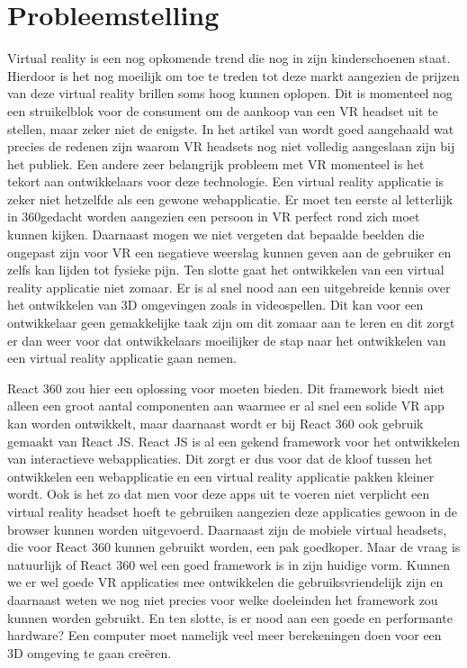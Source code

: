 \section{Probleemstelling}
\label{sec:probleemstelling}

Virtual reality is een nog opkomende trend die nog in zijn kinderschoenen staat. Hierdoor is het nog moeilijk om toe te treden tot deze markt aangezien de prijzen van deze virtual reality brillen soms hoog kunnen oplopen. Dit is momenteel nog een struikelblok voor de consument om de aankoop van een VR  headset uit te stellen, maar zeker niet de enigste. In het artikel van \autocite{Abarrera2017} wordt goed aangehaald wat precies de redenen zijn waarom VR headsets nog niet volledig aangeslaan zijn bij het publiek. Een andere zeer belangrijk probleem met VR momenteel is het tekort aan ontwikkelaars voor deze technologie. Een virtual reality applicatie is zeker niet hetzelfde als een gewone webapplicatie. Er moet ten eerste al letterlijk in 360\textdegree  gedacht worden aangezien een persoon in VR perfect rond zich moet kunnen kijken. Daarnaast mogen we niet vergeten dat bepaalde beelden die ongepast zijn voor VR een negatieve weerslag kunnen geven aan de gebruiker en zelfs kan lijden tot fysieke pijn. Ten slotte gaat het ontwikkelen van een virtual reality applicatie niet zomaar. Er is al snel nood aan een uitgebreide kennis over het ontwikkelen van 3D omgevingen zoals in videospellen. Dit kan voor een ontwikkelaar geen gemakkelijke taak zijn om dit zomaar aan te leren en dit zorgt er dan weer voor dat ontwikkelaars moeilijker de stap naar het ontwikkelen van een virtual reality applicatie gaan nemen.

React 360 zou hier een oplossing voor moeten bieden. Dit framework biedt niet alleen een groot aantal componenten aan waarmee er al snel een solide VR app kan worden ontwikkelt, maar daarnaast wordt er bij React 360 ook gebruik gemaakt van React JS. React JS is al een gekend framework voor het ontwikkelen van interactieve webapplicaties. Dit zorgt er dus voor dat de kloof tussen het ontwikkelen een webapplicatie en een virtual reality applicatie pakken kleiner wordt. Ook is het zo dat men voor deze apps uit te voeren niet verplicht een virtual reality headset hoeft te gebruiken aangezien deze applicaties gewoon in de browser kunnen worden uitgevoerd. Daarnaast zijn de mobiele virtual headsets, die voor React 360 kunnen gebruikt worden, een pak goedkoper. Maar de vraag is natuurlijk of React 360 wel een goed framework is in zijn huidige vorm. Kunnen we er wel goede VR applicaties mee ontwikkelen die gebruiksvriendelijk zijn en daarnaast weten we nog niet precies voor welke doeleinden het framework zou kunnen worden gebruikt. En ten slotte, is er nood aan een goede en performante hardware? Een computer moet namelijk veel meer berekeningen doen voor een 3D omgeving te gaan creëren.


